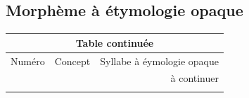 \documentclass{scrbook}
\newcounter{c}[subsubsection]
\begin{document}
\begin{sloppypar}
\begin{appendices}
\chapter{Morphème à étymologie opaque}\label{appendice3}

\begin{longtable}[htbp]{lll}
    \endfirsthead
	
	\multicolumn{3}{c}{Table continuée}\\
    \toprule
    Numéro & Concept & Syllabe à éymologie opaque \\
    \hline
    \endhead

    \hline
    \multicolumn{3}{r}{à continuer} \\
    \endfoot
    \endlastfoot
    

\end{longtable}
\end{appendices}
\end{sloppypar}
\end{document}
